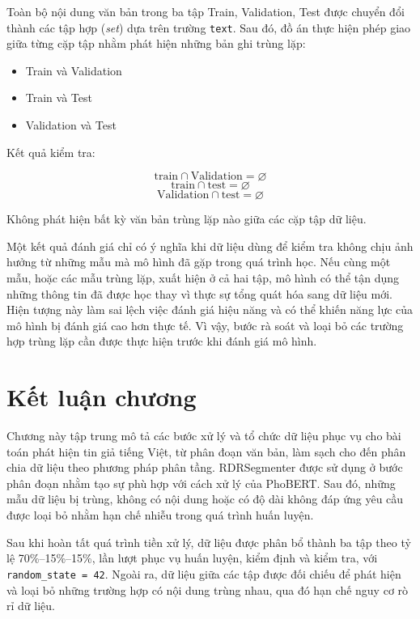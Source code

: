 Toàn bộ nội dung văn bản trong ba tập Train, Validation, Test được chuyển đổi thành các tập hợp (\textit{set}) dựa trên trường \texttt{text}. Sau đó, đồ án thực hiện phép giao giữa từng cặp tập nhằm phát hiện những bản ghi trùng lặp:

\begin{itemize}
    \item Train và Validation
    \item Train và Test
    \item Validation và Test
\end{itemize}

Kết quả kiểm tra:

\[
\text{train} \cap \text{Validation} = \varnothing
\]
\[
\text{train} \cap \text{test} = \varnothing
\]
\[
\text{Validation} \cap \text{test} = \varnothing
\]

Không phát hiện bất kỳ văn bản trùng lặp nào giữa các cặp tập dữ liệu.

Một kết quả đánh giá chỉ có ý nghĩa khi dữ liệu dùng để kiểm tra không chịu ảnh hưởng từ những mẫu mà mô hình đã gặp trong quá trình học. Nếu cùng một mẫu, hoặc các mẫu trùng lặp, xuất hiện ở cả hai tập, mô hình có thể tận dụng những thông tin đã được học thay vì thực sự tổng quát hóa sang dữ liệu mới. Hiện tượng này làm sai lệch việc đánh giá hiệu năng và có thể khiến năng lực của mô hình bị đánh giá cao hơn thực tế. Vì vậy, bước rà soát và loại bỏ các trường hợp trùng lặp cần được thực hiện trước khi đánh giá mô hình.

\section{Kết luận chương}

Chương này tập trung mô tả các bước xử lý và tổ chức dữ liệu phục vụ cho bài toán phát hiện tin giả tiếng Việt, từ phân đoạn văn bản, làm sạch cho đến phân chia dữ liệu theo phương pháp phân tầng. RDRSegmenter được sử dụng ở bước phân đoạn nhằm tạo sự phù hợp với cách xử lý của PhoBERT. Sau đó, những mẫu dữ liệu bị trùng, không có nội dung hoặc có độ dài không đáp ứng yêu cầu được loại bỏ nhằm hạn chế nhiễu trong quá trình huấn luyện.

Sau khi hoàn tất quá trình tiền xử lý, dữ liệu được phân bổ thành ba tập theo tỷ lệ 70\%--15\%--15\%, lần lượt phục vụ huấn luyện, kiểm định và kiểm tra, với \texttt{random\_state = 42}. Ngoài ra, dữ liệu giữa các tập được đối chiếu để phát hiện và loại bỏ những trường hợp có nội dung trùng nhau, qua đó hạn chế nguy cơ rò rỉ dữ liệu.

\clearpage